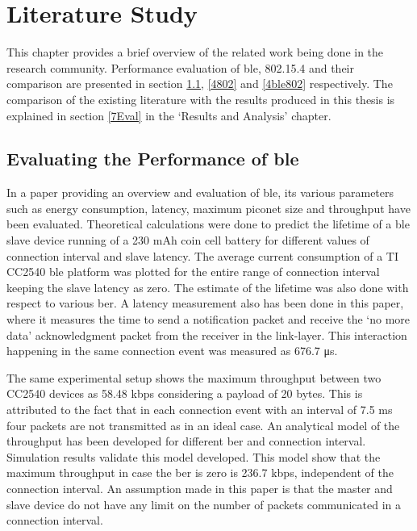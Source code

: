\chapter{Literature Study} \label{4LitStudy}

This chapter provides a brief overview of the related work being done in the research community. Performance evaluation of \gls{ble}, 802.15.4 and their comparison are presented in section \ref{4ble}, \ref{4802} and \ref{4ble802} respectively. The comparison of the existing literature with the results produced in this thesis is explained in section \ref{7Eval} in the `Results and Analysis' chapter.

\section{Evaluating the Performance of \texorpdfstring{\gls{ble}}{BLE}} \label{4ble}
In a paper  \cite{Gomez2012} providing an overview and evaluation of \gls{ble}, its various parameters such as energy consumption, latency, maximum piconet size and throughput have been evaluated. Theoretical calculations were done to predict the lifetime of a \gls{ble} slave device running of a 230 mAh coin cell battery for different values of connection interval and slave latency. The average current consumption of a TI CC2540 \gls{ble} platform was plotted for the entire range of connection interval keeping the slave latency as zero. The estimate of the lifetime was also done with respect to various \gls{ber}. A latency measurement also has been done in this paper, where it measures the time to send a notification packet and receive the `no more data' acknowledgment packet from the receiver in the link-layer. This interaction happening in the same connection event was measured as 676.7 \si{\micro \second}.

The same experimental setup  \cite{Gomez2012} shows the maximum throughput between two CC2540 devices as 58.48 kbps considering a payload of 20 bytes. This is attributed to the fact that in each connection event with an interval of 7.5 ms four packets are not transmitted as in an ideal case. An analytical model of the throughput  \cite{Gomez2011} has been developed for different \gls{ber} and connection interval. Simulation results validate this model developed. This model show that the maximum throughput in case the \gls{ber} is zero is 236.7 kbps, independent of the connection interval. An assumption made in this paper is that the master and slave device do not have any limit on the number of packets communicated in a connection interval. 


